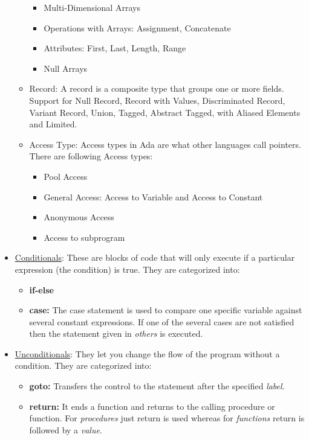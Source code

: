 \documentclass{article}
\begin{document}
\begin{itemize}
\begin{itemize}
\begin{itemize}
		\item Multi-Dimensional Arrays
		\item Operations with Arrays: Assignment, Concatenate
		\item Attributes: First, Last, Length, Range
		\item Null Arrays		
		\end{itemize}
		\item Record: A record is a composite type that groups one or more fields. \\
		Support for Null Record, Record with Values, Discriminated Record, Variant Record, Union, Tagged, Abstract Tagged, with Aliased Elements and Limited.
		\item Access Type: Access types in Ada are what other languages call pointers. There are following Access types:
			\begin{itemize}
				\item Pool Access
				\item General Access: Access to Variable and Access to Constant
				\item Anonymous Access
				\item Access to subprogram
			\end{itemize}
	\end{itemize}
	\item \uline{Conditionals}: These are blocks of code that will only execute if a particular expression (the condition) is true. They are categorized into:
	\begin{itemize}
		\item \textbf{if-else}
		\item \textbf{case:} The case statement is used to compare one specific variable against several constant expressions. If one of the several cases are not satisfied then the statement given in \emph{others} is executed.		
	\end{itemize}	
	\item \uline{Unconditionals}: They let you change the flow of the program without a condition. They are categorized into:
		\begin{itemize}
			\item \textbf{goto:} Transfers the control to the statement after the specified \emph{label}.
			\item \textbf{return:} It ends a function and returns to the calling procedure or function. For \emph{procedures} just return is used whereas for \emph{functions} return is followed by a \emph{value}.
		\end{itemize}		

\end{itemize}
\end{document}
